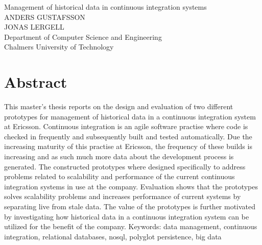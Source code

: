 Management of historical data in continuous integration systems\\
ANDERS GUSTAFSSON\\
JONAS LERGELL\\
Department of Computer Science and Engineering\\
Chalmers University of Technology\\

\thispagestyle{plain}			%
\section*{Abstract}
This master's thesis reports on the design and evaluation of two different prototypes for management of historical data in a continuous integration system at Ericsson. Continuous integration is an agile software practise where code is checked in frequently and subsequently built and tested automatically. Due the increasing maturity of this practise at Ericsson, the frequency of these builds is increasing and as such much more data about the development process is generated. The constructed prototypes where designed specifically to address problems related to scalability and performance of the current continuous integration systems in use at the company. Evaluation shows that the prototypes solves scalability problems and increases performance of current systems by separating live from stale data. The value of the prototypes is further motivated by investigating how historical data in a continuous integration system can be utilized for the benefit of the company.
\vfill
Keywords: data management, continuous integration, relational databases, nosql, polyglot persistence, big data

\newpage				%
\thispagestyle{empty}
\mbox{}